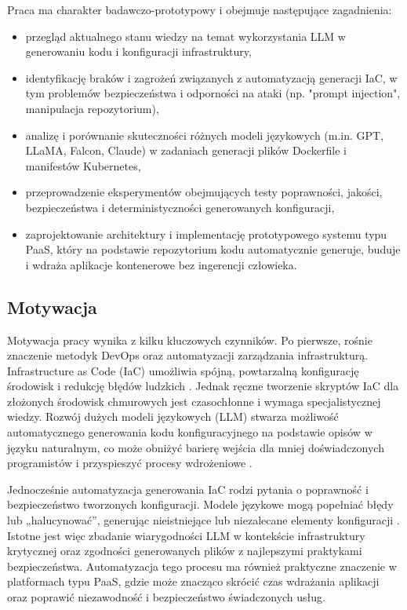 Praca ma charakter badawczo-prototypowy i obejmuje następujące zagadnienia:
\begin{itemize}
\item przegląd aktualnego stanu wiedzy na temat wykorzystania LLM w generowaniu kodu i konfiguracji infrastruktury,
\item identyfikację braków i zagrożeń związanych z automatyzacją generacji IaC, w tym problemów bezpieczeństwa i odporności na ataki (np. "prompt injection", manipulacja repozytorium),
\item analizę i porównanie skuteczności różnych modeli językowych (m.in. GPT, LLaMA, Falcon, Claude) w zadaniach generacji plików Dockerfile i manifestów Kubernetes,
\item przeprowadzenie eksperymentów obejmujących testy poprawności, jakości, bezpieczeństwa i deterministyczności generowanych konfiguracji,
\item zaprojektowanie architektury i implementację prototypowego systemu typu PaaS, który na podstawie repozytorium kodu automatycznie generuje, buduje i wdraża aplikacje kontenerowe bez ingerencji człowieka.
\end{itemize}

\subsection{Motywacja}

Motywacja pracy wynika z kilku kluczowych czynników. Po pierwsze, rośnie znaczenie metodyk DevOps oraz automatyzacji zarządzania infrastrukturą. Infrastructure as Code (IaC) umożliwia spójną, powtarzalną konfigurację środowisk i redukcję błędów ludzkich \cite{low_repairing_2024}. Jednak ręczne tworzenie skryptów IaC dla złożonych środowisk chmurowych jest czasochłonne i wymaga specjalistycznej wiedzy. Rozwój dużych modeli językowych (LLM) stwarza możliwość automatycznego generowania kodu konfiguracyjnego na podstawie opisów w języku naturalnym, co może obniżyć barierę wejścia dla mniej doświadczonych programistów i przyspieszyć procesy wdrożeniowe \cite{hu_llm-based_2025}.

Jednocześnie automatyzacja generowania IaC rodzi pytania o poprawność i bezpieczeństwo tworzonych konfiguracji. Modele językowe mogą popełniać błędy lub „halucynować”, generując nieistniejące lub niezalecane elementy konfiguracji \cite{malul_genkubesec_2024}. Istotne jest więc zbadanie wiarygodności LLM w kontekście infrastruktury krytycznej oraz zgodności generowanych plików z najlepszymi praktykami bezpieczeństwa. Automatyzacja tego procesu ma również praktyczne znaczenie w platformach typu PaaS, gdzie może znacząco skrócić czas wdrażania aplikacji oraz poprawić niezawodność i bezpieczeństwo świadczonych usług.

